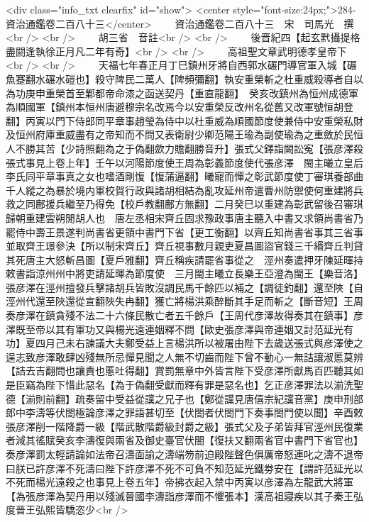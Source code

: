 <div class="info_txt clearfix" id="show">
<center style="font-size:24px;">284-資治通鑑卷二百八十三</center>
  　　資治通鑑卷二百八十三　宋　司馬光　撰<br />
<br />
　　胡三省　音註<br />
<br />
　　後晋紀四【起玄黓攝提格盡閼逢執徐正月凡二年有奇】<br />
<br />
　　高祖聖文章武明德孝皇帝下<br />
<br />
　　天福七年春正月丁巳鎮州牙將自西郭水碾門導官軍入城【碾魚蹇翻水碾水磑也】殺守陴民二萬人【陴頻彌翻】執安重榮斬之杜重威殺導者自以為功庚申重榮首至鄴都帝命漆之函送契丹【重直龍翻】　癸亥改鎮州為恒州成德軍為順國軍【鎮州本恒州唐避穆宗名改焉今以安重榮反改州名從舊又改軍號恒胡登翻】丙寅以門下侍郎同平章事趙瑩為侍中以杜重威為順國節度使兼侍中安重榮私財及恒州府庫重威盡有之帝知而不問又表衛尉少卿范陽王瑜為副使瑜為之重斂於民恒人不勝其苦【少詩照翻為之于偽翻歛力贍翻勝音升】張式父鐸詣闕訟寃【張彦澤殺張式事見上卷上年】壬午以河陽節度使王周為彰義節度使代張彦澤　閩主曦立皇后李氏同平章事真之女也嗜酒剛愎【愎蒲逼翻】曦寵而憚之彰武節度使丁審琪養部曲千人縱之為暴於境内軍校賀行政與諸胡相結為亂攻延州帝遣曹州防禦使何重建將兵救之同鄜援兵繼至乃得免【校戶教翻鄜方無翻】二月癸巳以重建為彰武留後召審琪歸朝重建雲朔閒胡人也　唐左丞相宋齊丘固求豫政事唐主聽入中書又求領尚書省乃罷侍中壽王景遂判尚書省更領中書門下省【更工衡翻】以齊丘知尚書省事其三省事並取齊王璟參決【所以制宋齊丘】齊丘視事數月親吏夏昌圖盜官錢三千緡齊丘判貸其死唐主大怒斬昌圖【夏戶雅翻】齊丘稱疾請罷省事從之　涇州奏遣押牙陳延暉持敕書詣涼州州中將吏請延暉為節度使　三月閩主曦立長樂王亞澄為閩王【樂音洛】　張彦澤在涇州擅發兵擊諸胡兵皆敗沒調民馬千餘匹以補之【調徒釣翻】還至陜【自涇州代還至陜還從宣翻陜失冉翻】獲亡將楊洪乘醉斷其手足而斬之【斷音短】王周奏彦澤在鎮貪殘不法二十六條民散亡者五千餘戶【王周代彦澤故得奏其在鎮事】彦澤既至帝以其有軍功又與楊光遠連姻釋不問【歐史張彦澤與帝連姻又討范延光有功】夏四月己未右諫議大夫鄭受益上言楊洪所以被屠由陛下去歲送張式與彦澤使之逞志致彦澤敢肆凶殘無所忌憚見聞之人無不切齒而陛下曾不動心一無詰讓淑慝莫辨【詰去吉翻問也讓責也慝吐得翻】賞罰無章中外皆言陛下受彦澤所獻馬百匹聽其如是臣竊為陛下惜此惡名【為于偽翻受獻而釋有罪是惡名也】乞正彦澤罪法以湔洗聖德【湔則前翻】疏奏留中受益從讜之兄子也【鄭從讜見唐僖宗紀讜音黨】庚申刑部郎中李濤等伏閤極論彦澤之罪語甚切至【伏閤者伏閤門下奏事閤門使以聞】辛酉敕張彦澤削一階降爵一級【階武散階爵級封爵之級】張式父及子弟皆拜官涇州民復業者減其徭賦癸亥李濤復與兩省及御史臺官伏閤【復扶又翻兩省官中書門下省官也】奏彦澤罰太輕請論如法帝召濤面諭之濤端笏前迫殿陛聲色俱厲帝怒連叱之濤不退帝曰朕已許彦澤不死濤曰陛下許彦澤不死不可負不知范延光鐵劵安在【謂許范延光以不死而楊光遠殺之也事見上卷五年】帝拂衣起入禁中丙寅以彦澤為左龍武大將軍【為張彦澤為契丹用以殘滅晉國李濤詣彦澤而不懼張本】漢高祖寢疾以其子秦王弘度晉王弘熙皆驕恣少<br />
